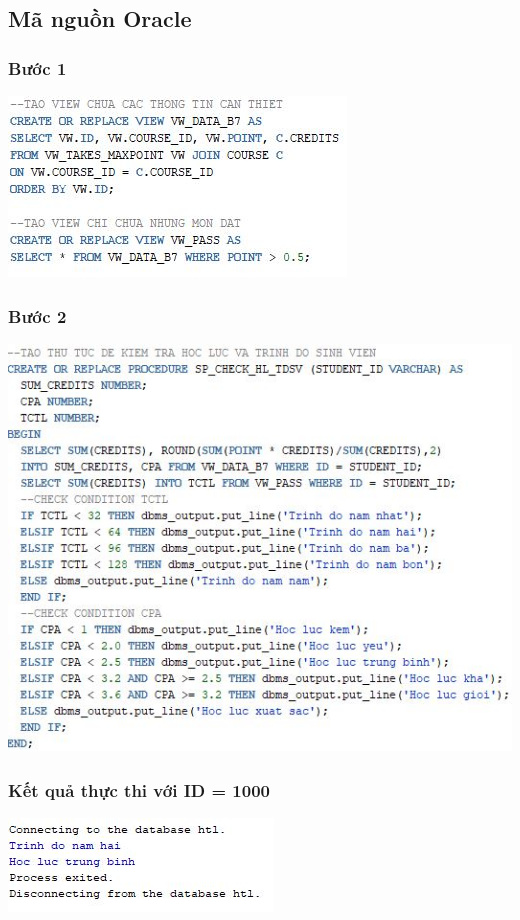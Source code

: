 \documentclass[12pt,a4paper]{report}
\begin{document}
\subsection{Mã nguồn Oracle}
\subsubsection{Bước 1}
\includegraphics[scale=1]{b7o1}
\subsubsection{Bước 2}
\includegraphics[scale=1]{b7o2}
\subsubsection{Kết quả thực thi với ID = 1000}
\includegraphics[scale=1]{kb7o}
\end{document}
